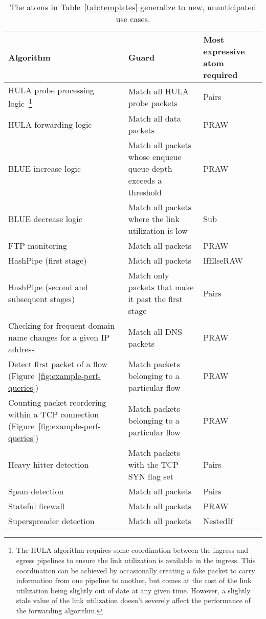 \begin{savenotes}
\begin{table*}[!t]
\centering
\begin{small}
  \begin{tabular}{|p{}|p{} | p{}|}
\hline
Algorithm & Guard & Most expressive atom required\\
\hline
HULA probe processing logic~\cite{hula}\footnote{The HULA algorithm requires
some coordination between the ingress and egress pipelines to ensure the link
utilization is available in the ingress. This coordination can be achieved by
occasionally creating a fake packet to carry information from one pipeline to
another, but comes at the cost of the link utilization being slightly out of
date at any given time. However, a slightly stale value of the link utilization
doesn't severely affect the performance of the forwarding algorithm.} & Match
all HULA probe packets & Pairs \\
\hline
HULA forwarding logic~\cite{hula} & Match all data packets & PRAW \\
\hline
BLUE increase logic~\cite{blue} & Match all packets whose enqueue queue depth exceeds a threshold & PRAW \\
\hline
BLUE decrease logic~\cite{blue} & Match all packets where the link utilization is low & Sub \\
\hline
FTP monitoring~\cite{snap} & Match all packets & PRAW \\
\hline
HashPipe (first stage)~\cite{hashpipe} & Match all packets & IfElseRAW \\
\hline
HashPipe (second and subsequent stages)~\cite{hashpipe} & Match only packets that make it past the first stage & Pairs\\
\hline
Checking for frequent domain name changes for a given IP address~\cite{snap} & Match all DNS packets & PRAW \\
\hline
Detect first packet of a flow (Figure~\ref{fig:example-perf-queries}) & Match packets belonging to a particular flow & PRAW \\
\hline
Counting packet reordering within a TCP connection (Figure~\ref{fig:example-perf-queries}) & Match packets belonging to a particular flow & PRAW \\
\hline
Heavy hitter detection~\cite{snap} & Match packets with the TCP SYN flag set & Pairs \\
\hline
Spam detection~\cite{snap} & Match all packets & Pairs \\
\hline
Stateful firewall~\cite{snap} & Match all packets & PRAW \\
\hline
Superspreader detection~\cite{snap} & Match all packets & NestedIf \\
\hline
\end{tabular}
\caption{The atoms in Table~\ref{tab:templates} generalize to new, unanticipated use cases.}
\label{tab:atoms_generalize}
\end{small}
\end{table*}
\end{savenotes}
